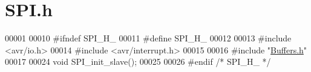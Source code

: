 \hypertarget{kommunikation_2komm__modul_2komm__modul_2_s_p_i_8h_source}{}\section{S\+P\+I.\+h}
\label{kommunikation_2komm__modul_2komm__modul_2_s_p_i_8h_source}

\begin{DoxyCode}
00001 
00010 \textcolor{preprocessor}{#ifndef SPI\_H\_}
00011 \textcolor{preprocessor}{#define SPI\_H\_}
00012 
00013 \textcolor{preprocessor}{#include <avr/io.h>}
00014 \textcolor{preprocessor}{#include <avr/interrupt.h>}
00015 
00016 \textcolor{preprocessor}{#include "\hyperlink{_buffers_8h}{Buffers.h}"}
00017 
00024 \textcolor{keywordtype}{void} SPI\_init\_slave();
00025 
00026 \textcolor{preprocessor}{#endif }\textcolor{comment}{/* SPI\_H\_ */}\textcolor{preprocessor}{}
\end{DoxyCode}
